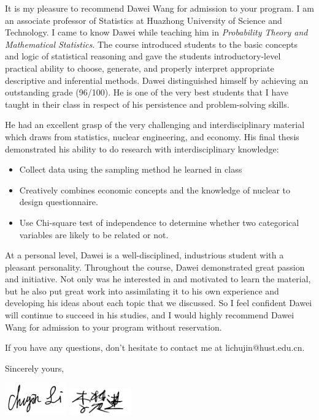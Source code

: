 \documentclass{article}
\begin{document}

It is my pleasure to recommend Dawei Wang for admission to your program. I am an associate professor of Statistics at Huazhong University of Science and Technology. I came to know Dawei while teaching him in \textit{Probability Theory and Mathematical Statistics}. The course introduced students to the basic concepts and logic of statistical reasoning and gave the students introductory-level practical ability to choose, generate, and properly interpret appropriate descriptive and inferential methods. Dawei distinguished himself by achieving an outstanding grade (96/100). He is one of the very best students that I have taught in their class in respect of his persistence and problem-solving skills.

	He had an excellent grasp of the very challenging and interdisciplinary material which draws from
statistics, nuclear engineering, and economy. His final thesis demonstrated his ability to do research with interdisciplinary knowledge:

\begin{itemize}
	\item Collect data using the sampling method he learned in class
	\item Creatively combines economic concepts and the knowledge of nuclear to design questionnaire.
	\item Use Chi-square test of independence to determine whether two categorical variables are likely to be related or not.
\end{itemize}

	At a personal level, Dawei is a well-disciplined, industrious student with a pleasant personality. Throughout the course, Dawei demonstrated great passion and initiative. Not only was he interested in and motivated to learn the material, but he also put great work into assimilating it to his own experience and developing his ideas about each topic that we discussed. So I feel confident Dawei will continue to succeed in his studies, and I would highly recommend Dawei Wang for admission to your program without reservation.
	
	If you have any questions, don't hesitate to contact me at lichujin@hust.edu.cn.


Sincerely yours,

\includegraphics[width=0.2\textwidth]{Li_English.pic.jpg}
\includegraphics[width=0.2\textwidth]{Li_Chinese.png}



\end{document}

